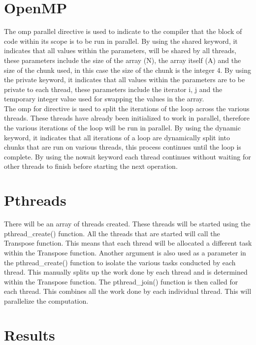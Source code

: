 \documentclass[conference]{IEEEtran}
\begin{document}
\bigskip

\section{OpenMP}

The omp parallel directive is used to indicate to the compiler that the block of code within its scope is to be run in parallel. By using the shared keyword, it indicates that all values within the parameters, will be shared by all threads, these parameters include the size of the array (N), the array itself (A) and the size of the chunk used, in this case the size of the chunk is the integer 4. By using the private keyword, it indicates that all values within the parameters are to be private to each thread, these parameters include the iterator i, j and the temporary integer value used for swapping the values in the array.\\

The omp for directive is used to split the iterations of the loop across the various threads. These threads have already been initialized to work in parallel, therefore the various iterations of the loop will be run in parallel. By using the dynamic keyword, it indicates that all iterations of a loop are dynamically split into chunks that are run on various threads, this process continues until the loop is complete. By using the nowait keyword each thread continues without waiting for other threads to finish before starting the next operation.\\


\section{Pthreads}

There will be an array of threads created. These threads will be started using the pthread\_create() function. All the threads that are started will call the Transpose function. This means that each thread will be allocated a different task within the Transpose function. Another argument is also used as a parameter in the pthread\_create() function to isolate the various tasks conducted by each thread. This manually splits up the work done by each thread and is determined within the Transpose function. The pthread\_join() function is then called for each thread. This combines all the work done by each individual thread. This will parallelize the computation. \\


\section{Results}
\end{document}
